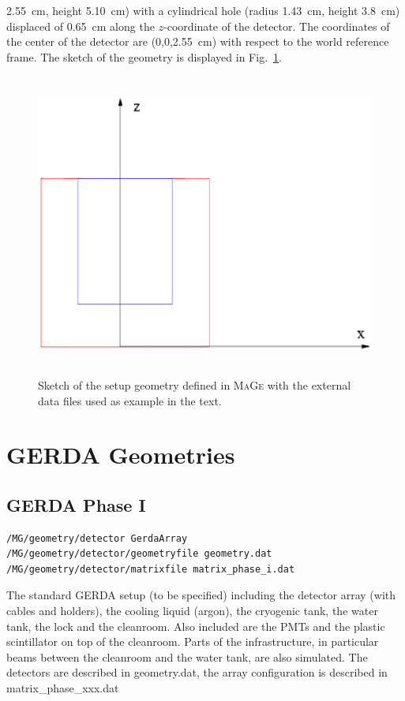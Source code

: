 2.55~cm, height 5.10~cm) with a cylindrical hole (radius 1.43~cm, height 3.8~cm) displaced 
of 0.65~cm along the $z$-coordinate of the detector. The coordinates of the center of the 
detector are (0,0,2.55~cm) with respect to the world reference frame. The sketch of the 
geometry is displayed in Fig.~\ref{testgeometry}. \\
\nopagebreak
\begin{figure}[tb]
\begin{center}
\includegraphics[height=10cm]{figures/geom-from-file}
\caption{Sketch of the setup geometry defined in \textsc{MaGe} with the external 
data files used as example in the text.}\label{testgeometry}
\end{center}
\end{figure}
%
\section{GERDA Geometries}
 
\subsection{GERDA Phase I}
\begin{lstlisting}
/MG/geometry/detector GerdaArray
/MG/geometry/detector/geometryfile geometry.dat
/MG/geometry/detector/matrixfile matrix_phase_i.dat
\end{lstlisting}
The standard GERDA setup (to be specified) including the detector
array (with cables and holders), the cooling liquid (argon), the
cryogenic tank, the water tank, the lock and the cleanroom. Also
included are the PMTs and the plastic scintillator on top of the
cleanroom. Parts of the infrastructure, in particular beams between
the cleanroom and the water tank, are also simulated. The detectors
are described in geometry.dat, the array configuration is described in
matrix\_phase\_xxx.dat\\


